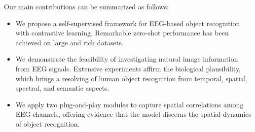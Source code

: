 Our main contributions can be summarized as follows:\begin{itemize}
    \item 
    We propose a self-supervised framework for EEG-based object recognition with contrastive learning. Remarkable zero-shot performance has been achieved on large and rich datasets.
    \item
    We demonstrate the feasibility of investigating natural image information from EEG signals. Extensive experiments affirm the biological plausibility, which brings a resolving of human object recognition from temporal, spatial, spectral, and semantic aspects.    
    \item 
    We apply two plug-and-play modules to capture spatial correlations among EEG channels, offering evidence that the model discerns the spatial dynamics of object recognition.

\end{itemize}

